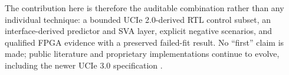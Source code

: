 The contribution here is therefore the auditable combination rather than any
individual technique: a bounded UCIe 2.0-derived RTL control subset, an
interface-derived predictor and SVA layer, explicit negative scenarios, and
qualified FPGA evidence with a preserved failed-fit result. No “first” claim is
made; public literature and proprietary implementations continue to evolve,
including the newer UCIe 3.0 specification \cite{ucie30}.
